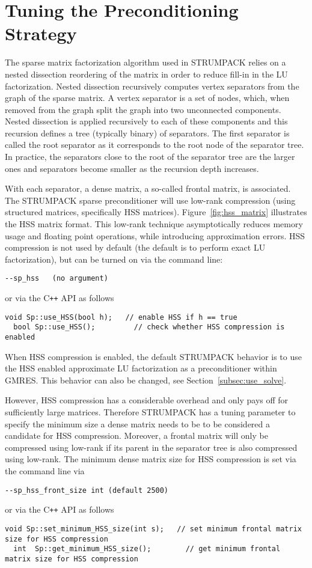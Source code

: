 \documentclass{article}
\begin{document}
\section{Tuning the Preconditioning Strategy}\label{sec:tune_prec}

The sparse matrix factorization algorithm used in STRUMPACK relies on
a nested dissection reordering of the matrix in order to reduce
fill-in in the LU factorization. Nested dissection recursively
computes vertex separators from the graph of the sparse matrix. A
vertex separator is a set of nodes, which, when removed from the graph
split the graph into two unconnected components. Nested dissection is
applied recursively to each of these components and this recursion
defines a tree (typically binary) of separators. The first separator
is called the root separator as it corresponds to the root node of the
separator tree. In practice, the separators close to the root of the
separator tree are the larger ones and separators become smaller as
the recursion depth increases.

With each separator, a dense matrix, a so-called frontal matrix, is
associated. The STRUMPACK sparse preconditioner will use low-rank
compression (using structured matrices, specifically HSS
matrices). Figure~\ref{fig:hss_matrix} illustrates the HSS matrix
format. This low-rank technique asymptotically reduces memory usage
and floating point operations, while introducing approximation
errors. HSS compression is not used by default (the default is to
perform exact LU factorization), but can be turned on via the command
line:
\begin{lstlisting}[style=Bash]
  --sp_hss   (no argument)
\end{lstlisting}
or via the C\texttt{++} API as follows
\begin{lstlisting}[style=C]
  void Sp::use_HSS(bool h);   // enable HSS if h == true
  bool Sp::use_HSS();         // check whether HSS compression is enabled
\end{lstlisting}
When HSS compression is enabled, the default STRUMPACK behavior is to
use the HSS enabled approximate LU factorization as a preconditioner
within GMRES. This behavior can also be changed, see
Section~\ref{subsec:use_solve}.

However, HSS compression has a considerable overhead and only pays off
for sufficiently large matrices. Therefore STRUMPACK has a tuning
parameter to specify the minimum size a dense matrix needs to be to be
considered a candidate for HSS compression. Moreover, a frontal matrix
will only be compressed using low-rank if its parent in the separator
tree is also compressed using low-rank.  The minimum dense matrix size
for HSS compression is set via the command line via
\begin{lstlisting}[style=Bash]
  --sp_hss_front_size int (default 2500)
\end{lstlisting}
or via the C\texttt{++} API as follows
\begin{lstlisting}[style=C]
  void Sp::set_minimum_HSS_size(int s);   // set minimum frontal matrix size for HSS compression
  int  Sp::get_minimum_HSS_size();        // get minimum frontal matrix size for HSS compression
\end{lstlisting}
\end{document}
